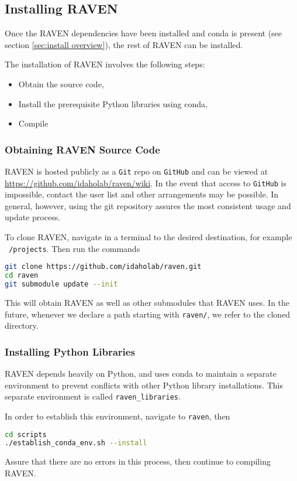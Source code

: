 \subsection{Installing RAVEN}
\label{sec:clone raven}

Once the RAVEN dependencies have been installed  and conda is present
(see section \ref{sec:install overview}), the rest of RAVEN can be installed.

The installation of RAVEN involves the following steps:
\begin{itemize}
  \item Obtain the source code,
  \item Install the prerequisite Python libraries using conda,
  \item Compile
\end{itemize}




\subsubsection{Obtaining RAVEN Source Code}
RAVEN is hosted publicly as a \texttt{Git} repo on \texttt{GitHub}
and can be viewed at \url{https://github.com/idaholab/raven/wiki}.
In the event that access to \texttt{GitHub} is impossible, contact the user list and other arrangements may be
possible.  In general, however, using the git repository assures the most consistent usage and update process.

To clone RAVEN, navigate in a terminal to the desired destination, for example \texttt{~/projects}.  Then run
the commands
\begin{lstlisting}[language=bash]
git clone https://github.com/idaholab/raven.git
cd raven
git submodule update --init
\end{lstlisting}
This will obtain RAVEN as well as other submodules that RAVEN uses.  In the future, whenever we declare a path
starting with \texttt{raven/}, we refer to the cloned directory.




\subsubsection{Installing Python Libraries}
RAVEN depends heavily on Python, and uses conda to maintain a separate environment to prevent conflicts with
other Python library installations.  This separate environment is called \texttt{raven\_libraries}.

In order to establish this environment, navigate to \texttt{raven}, then
\begin{lstlisting}[language=bash]
cd scripts
./establish_conda_env.sh --install
\end{lstlisting}
Assure that there are no errors in this process, then continue to compiling RAVEN.

